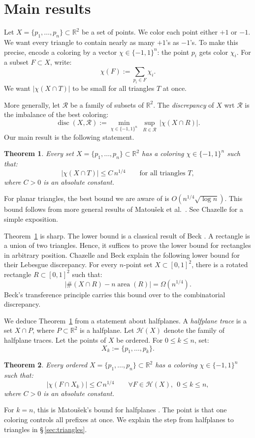 \documentclass[12pt,reqno]{amsart}
\def\le{\leqslant}
\def\le{\leqslant}
\newtheorem{theorem}{Theorem}[section]
\theoremstyle{remark}
\numberwithin{equation}{section}
\DeclareMathOperator{\disc}{disc}
\def \R {\mathbb{R}}
\begin{document}
\section{Main results}\label{intro}
Let \(X=\{p_1,\ldots,p_n\}\subset\R^2\) be a set of points. We color each point either \(+1\) or \(-1\). We want every triangle to contain nearly as many \(+1\)'s as \(-1\)'s. To make this precise, encode a coloring by a vector \(\chi\in\{-1,1\}^n\): the point \(p_i\) gets color \(\chi_i\). For a subset 
\(F\subset X\), write:
\[
\chi(F):=\sum_{p_i\in F}\chi_i.
\]
We want \(|\chi(X\cap T)|\) to be small for all triangles \(T\) at once.
\smallskip%

More generally, let \(\mathcal R\) be a family of subsets of \(\R^2\). The \emph{discrepancy} of \(X\) wrt \(\mathcal R\) is the imbalance of the best coloring:
\[
\disc(X,\mathcal R):=\min_{\chi\in\{-1,1\}^n}\ \sup_{R\in\mathcal R}\,|\chi(X\cap R)|.
\]
Our main result is the following statement.

\begin{theorem}\label{thm:triangles}
Every set \(X=\{p_1,\ldots,p_n\}\subset\R^2\) has a coloring \(\chi\in\{-1,1\}^n\) such that:
\[
|\chi(X\cap T)|\le C\,n^{1/4}\qquad\text{for all triangles }T,
\]
where \(C>0\) is an absolute constant.
\end{theorem}

For planar triangles, the best bound we are aware of is \(O(n^{1/4}\sqrt{\log n})\). This bound follows from more general results of Matou\v{s}ek et al.\ \cite{MWW}. See Chazelle \cite[\S\,1.4]{Chaz} for a simple exposition. 
\smallskip%

Theorem~\ref{thm:triangles} is sharp. The lower bound is a classical result of Beck \cite{Beck-2}. A rectangle is a union of two triangles. Hence, it suffices to prove the lower bound for rectangles in arbitrary position. Chazelle \cite[\S\,3.2]{Chaz} and Beck \cite{Beck-2} explain the following lower bound for their Lebesgue discrepancy. For every \(n\)-point set \(X\subset[0,1]^2\), there is a rotated rectangle \(R\subset[0,1]^2\) such that:
\[
\bigl|\#(X\cap R)-n\operatorname{area}(R)\bigr|=\Omega(n^{1/4}).
\]
Beck's transference principle \cite{Beck-1} carries this bound over to the combinatorial discrepancy.
\smallskip%

We deduce Theorem~\ref{thm:triangles} from a statement about halfplanes. A \emph{halfplane trace} is a set \(X\cap P\), where \(P\subset\R^2\) is a halfplane. Let \(\mathcal H(X)\) denote the family of halfplane traces. Let the points of \(X\) be ordered. For \(0\le k\le n\), set:
\[
X_k:=\{p_1,\ldots,p_k\}.
\]
\begin{theorem}\label{thm:prefix1}
Every ordered \(X=\{p_1,\ldots,p_n\}\subset\R^2\) has a coloring \(\chi\in\{-1,1\}^n\) such that:
\[
|\chi(F\cap X_k)|\le C\,n^{1/4}\qquad\forall F\in\mathcal H(X),\ \ 0\le k\le n,
\]
where \(C>0\) is an absolute constant.
\end{theorem}
For \(k=n\), this is Matou\v{s}ek's bound for halfplanes \cite{Mat-halfspaces}. The point is that one coloring controls all prefixes at once. We explain the step from halfplanes to triangles in \S\,\ref{sec:triangles}.
\smallskip%
\end{document}

